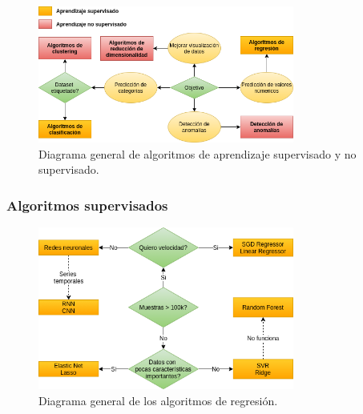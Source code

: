 \documentclass[a4paper,12pt]{article}
\begin{document}
\begin{figure}[H]
	\begin{center}
		\includegraphics[width=0.75\textwidth]{maindiagram.png}
		\caption{Diagrama general de algoritmos de aprendizaje supervisado y no supervisado.}
		\label{fig:maindiagram.}
	\end{center}
\end{figure}

\subsubsection{Algoritmos supervisados}
\begin{figure}[H]
	\begin{center}
		\includegraphics[width=0.75\textwidth]{regressiondiagram.png}
		\caption{Diagrama general de los algoritmos de regresión.}
		\label{fig:regressiondiagram.}
	\end{center}
\end{figure}
\end{document}
